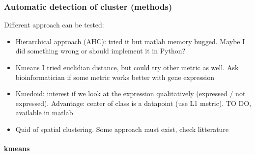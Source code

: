 \documentclass[]{article}
\begin{document}
\subsubsection{Automatic detection of cluster (methods)}
Different approach can be tested:
\begin{itemize}
	\item Hierarchical approach (AHC): tried it but matlab memory bugged. Maybe I did something wrong or should implement it in Python?
	\item Kmeans
	{\color{blue} I tried euclidian distance, but could try other metric as well. Ask bioinformatician if some metric works better with gene expression }
	\item Kmedoid: interest if we look at the expression qualitatively (expressed / not expressed). Advantage: center of class is a datapoint (use L1 metric). {\color{blue} TO DO, available in matlab}
	\item {\color{blue}Quid of spatial clustering. Some approach must exist, check litterature}
\end{itemize}
\paragraph{kmeans}
\end{document}

